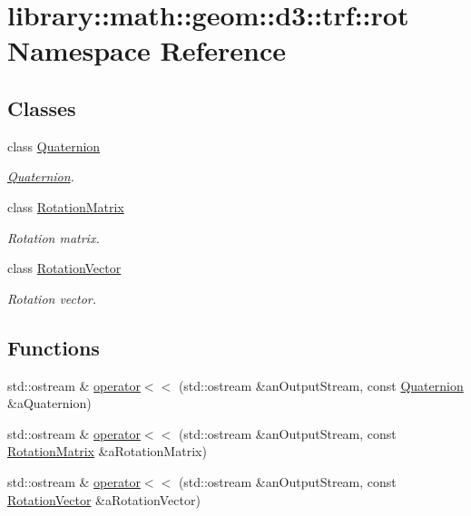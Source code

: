 \hypertarget{namespacelibrary_1_1math_1_1geom_1_1d3_1_1trf_1_1rot}{}\section{library\+:\+:math\+:\+:geom\+:\+:d3\+:\+:trf\+:\+:rot Namespace Reference}
\label{namespacelibrary_1_1math_1_1geom_1_1d3_1_1trf_1_1rot}
\subsection*{Classes}
\begin{DoxyCompactItemize}
\item 
class \hyperlink{classlibrary_1_1math_1_1geom_1_1d3_1_1trf_1_1rot_1_1_quaternion}{Quaternion}
\begin{DoxyCompactList}\small\item\em \hyperlink{classlibrary_1_1math_1_1geom_1_1d3_1_1trf_1_1rot_1_1_quaternion}{Quaternion}. \end{DoxyCompactList}\item 
class \hyperlink{classlibrary_1_1math_1_1geom_1_1d3_1_1trf_1_1rot_1_1_rotation_matrix}{Rotation\+Matrix}
\begin{DoxyCompactList}\small\item\em Rotation matrix. \end{DoxyCompactList}\item 
class \hyperlink{classlibrary_1_1math_1_1geom_1_1d3_1_1trf_1_1rot_1_1_rotation_vector}{Rotation\+Vector}
\begin{DoxyCompactList}\small\item\em Rotation vector. \end{DoxyCompactList}\end{DoxyCompactItemize}
\subsection*{Functions}
\begin{DoxyCompactItemize}
\item 
std\+::ostream \& \hyperlink{namespacelibrary_1_1math_1_1geom_1_1d3_1_1trf_1_1rot_a2de0150ce5e5bc444f34679d9423c87b}{operator$<$$<$} (std\+::ostream \&an\+Output\+Stream, const \hyperlink{classlibrary_1_1math_1_1geom_1_1d3_1_1trf_1_1rot_1_1_quaternion}{Quaternion} \&a\+Quaternion)
\item 
std\+::ostream \& \hyperlink{namespacelibrary_1_1math_1_1geom_1_1d3_1_1trf_1_1rot_a1e026918e3062f1350e4d3b61504d92d}{operator$<$$<$} (std\+::ostream \&an\+Output\+Stream, const \hyperlink{classlibrary_1_1math_1_1geom_1_1d3_1_1trf_1_1rot_1_1_rotation_matrix}{Rotation\+Matrix} \&a\+Rotation\+Matrix)
\item 
std\+::ostream \& \hyperlink{namespacelibrary_1_1math_1_1geom_1_1d3_1_1trf_1_1rot_a84ce7d3ccbc6bf4ee05fc3674106373f}{operator$<$$<$} (std\+::ostream \&an\+Output\+Stream, const \hyperlink{classlibrary_1_1math_1_1geom_1_1d3_1_1trf_1_1rot_1_1_rotation_vector}{Rotation\+Vector} \&a\+Rotation\+Vector)
\end{DoxyCompactItemize}


